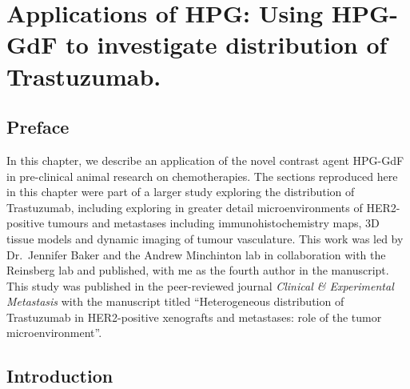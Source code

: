 

\chapter{Applications of HPG: Using \acs{HPG-GdF} to investigate distribution of Trastuzumab.}
\label{ch:HPG2}

\section{Preface}

In this chapter, we describe an application of the novel contrast agent \acs{HPG-GdF} in pre-clinical animal research on chemotherapies.
The sections reproduced here in this chapter were part of a larger study exploring the distribution of Trastuzumab, including exploring in greater detail microenvironments of \acs{HER2}-positive tumours and metastases including immunohistochemistry maps, 3D tissue models and dynamic imaging of tumour vasculature.
This work was led by Dr.\ Jennifer Baker and the Andrew Minchinton lab in collaboration with the Reinsberg lab and published, with me as the fourth author in the manuscript.
This study was published in the peer-reviewed journal \emph{Clinical \& Experimental Metastasis} with the manuscript titled ``Heterogeneous distribution of Trastuzumab in \acs{HER2}-positive xenografts and metastases: role of the tumor microenvironment''.

\section{Introduction}

